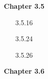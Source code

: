\documentclass[10pt,twoside,reqno]{article}
\begin{document}
\textbf{Chapter 3.5}
\begin{enumerate}
\item[3.5.16]  



\item[3.5.24] 
\vspace{3mm} 



\item[3.5.26]  
\vspace{3mm}



\end{enumerate}
\vspace{5mm}
\textbf{Chapter 3.6}
\end{document}
